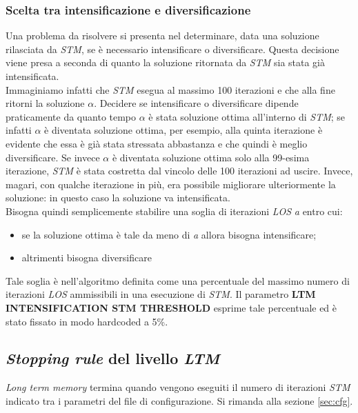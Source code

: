 \subsubsection{Scelta tra intensificazione e diversificazione}
Una problema da risolvere si presenta nel determinare, data una soluzione rilasciata da \emph{STM}, se è necessario intensificare o diversificare. 
Questa decisione viene presa a seconda di quanto la soluzione ritornata da \emph{STM} sia stata già intensificata.\\
Immaginiamo infatti che \emph{STM} esegua al massimo 100 iterazioni e che alla fine ritorni la soluzione $\alpha$. Decidere se intensificare o diversificare dipende praticamente da quanto tempo $\alpha$ è stata soluzione ottima all'interno di \emph{STM}; se infatti $\alpha$ è diventata soluzione ottima, per esempio, alla quinta iterazione è evidente che essa è già stata stressata abbastanza e che quindi è meglio diversificare. Se invece $\alpha$ è diventata soluzione ottima solo alla 99-esima iterazione, \emph{STM} è stata costretta dal vincolo delle
100 iterazioni ad uscire. Invece, magari, con qualche iterazione in più, era possibile migliorare ulteriormente la soluzione: in questo caso
la soluzione va intensificata.\\
Bisogna quindi semplicemente stabilire una soglia di iterazioni \emph{LOS} \emph{a} entro cui:
\begin{itemize}
	\item se la soluzione ottima è tale da meno di \emph{a} allora bisogna intensificare;
	\item altrimenti bisogna diversificare
\end{itemize}
Tale soglia è nell'algoritmo definita come una percentuale del massimo numero di iterazioni \emph{LOS} ammissibili in una esecuzione di \emph{STM}.
Il parametro \textbf{LTM INTENSIFICATION STM THRESHOLD} esprime tale percentuale ed è stato fissato in modo hardcoded a 5\%.

\subsection{\emph{Stopping rule} del livello \emph{LTM}}
\emph{Long term memory} termina quando vengono eseguiti il numero di iterazioni \emph{STM} indicato tra i parametri del file di configurazione. Si rimanda alla sezione \ref{sec:cfg}.

